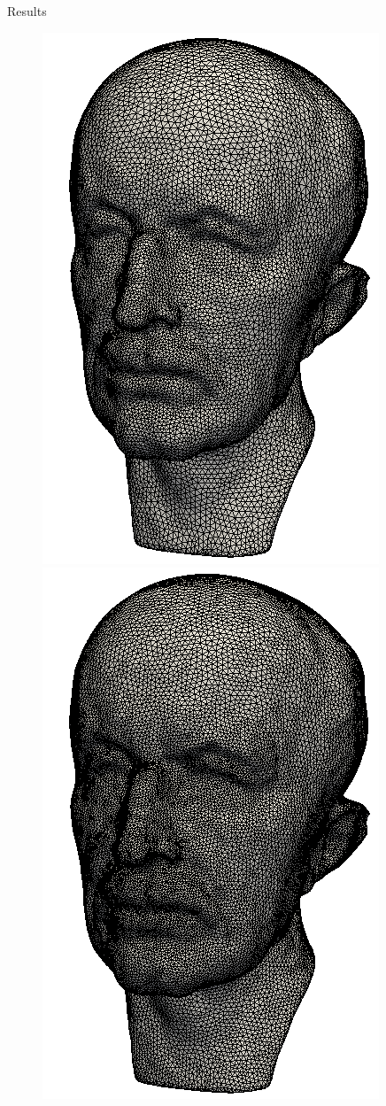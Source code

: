 \documentclass{beamer}
\begin{document}
\begin{frame}[plain]{Results}
\begin{figure}
\begin{minipage}{0.31\textwidth}
    \end{minipage}
    \begin{minipage}{.31\textwidth}
      \centering
      \includegraphics[width=0.7\linewidth]{../image/mpr_d.png}
    \end{minipage} 
    \begin{minipage}{0.31\textwidth}
      \centering
      \includegraphics[width=0.7\linewidth]{../image/mpr_e.png}
    \end{minipage}
  \end{figure}


\end{frame}
\end{document}
